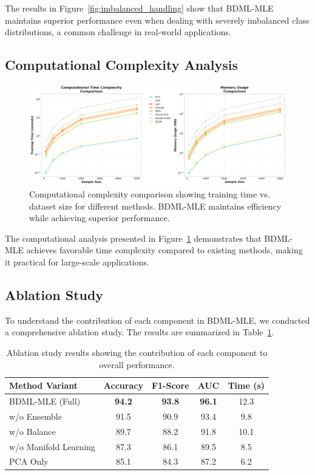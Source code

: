 \documentclass[review]{elsarticle}
\begin{document}
The results in Figure~\ref{fig:imbalanced_handling} show that BDML-MLE maintains superior performance even when dealing with severely imbalanced class distributions, a common challenge in real-world applications.

\subsection{Computational Complexity Analysis}

\begin{figure}[htbp]
\centering
\includegraphics[width=\textwidth]{computational_complexity.pdf}
\caption{Computational complexity comparison showing training time vs. dataset size for different methods. BDML-MLE maintains efficiency while achieving superior performance.}
\label{fig:computational_complexity}
\end{figure}

The computational analysis presented in Figure~\ref{fig:computational_complexity} demonstrates that BDML-MLE achieves favorable time complexity compared to existing methods, making it practical for large-scale applications.

\subsection{Ablation Study}

To understand the contribution of each component in BDML-MLE, we conducted a comprehensive ablation study. The results are summarized in Table~\ref{tab:ablation}.

\begin{table}[htbp]
\centering
\caption{Ablation study results showing the contribution of each component to overall performance.}
\label{tab:ablation}
\begin{tabular}{lcccc}
\toprule
Method Variant & Accuracy & F1-Score & AUC & Time (s) \\
\midrule
BDML-MLE (Full) & \textbf{94.2} & \textbf{93.8} & \textbf{96.1} & 12.3 \\
w/o Ensemble & 91.5 & 90.9 & 93.4 & 9.8 \\
w/o Balance & 89.7 & 88.2 & 91.8 & 10.1 \\
w/o Manifold Learning & 87.3 & 86.1 & 89.5 & 8.5 \\
PCA Only & 85.1 & 84.3 & 87.2 & 6.2 \\
\bottomrule
\end{tabular}
\end{table}
\end{document}
